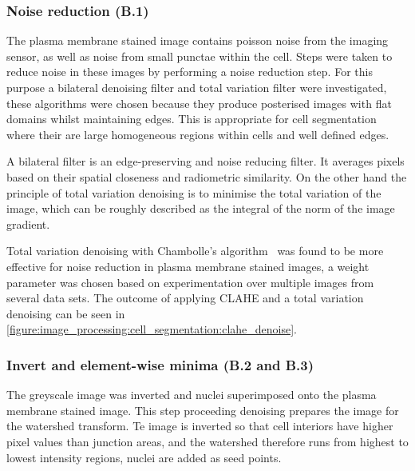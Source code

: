 \subsubsection{Noise reduction (B.1)}
The plasma membrane stained image contains poisson noise from the imaging sensor, as well as noise from small punctae within the cell. Steps were taken to reduce noise in these images by performing a noise reduction step. For this purpose a bilateral denoising filter and total variation filter were investigated, these algorithms were chosen because they produce posterised images with flat domains whilst maintaining edges. This is appropriate for cell segmentation where their are large homogeneous regions within cells and well defined edges.

A bilateral filter is an edge-preserving and noise reducing filter. It averages pixels based on their spatial closeness and radiometric similarity. On the other hand the principle of total variation denoising is to minimise the total variation of the image, which can be roughly described as the integral of the norm of the image gradient.

Total variation denoising with Chambolle's algorithm~\cite{Chambolle2004} was found to be more effective for noise reduction in plasma membrane stained images, a weight parameter was chosen based on experimentation over multiple images from several data sets. The outcome of applying CLAHE and a total variation denoising can be seen in \autoref{figure:image_processing:cell_segmentation:clahe_denoise}.

\subsubsection{Invert and element-wise minima (B.2 and B.3)}
The greyscale image was inverted and nuclei superimposed onto the plasma membrane stained image. This step proceeding denoising prepares the image for the watershed transform. Te image is inverted so that cell interiors have higher pixel values than junction areas, and the watershed therefore runs from highest to lowest intensity regions, nuclei are added as seed points.

